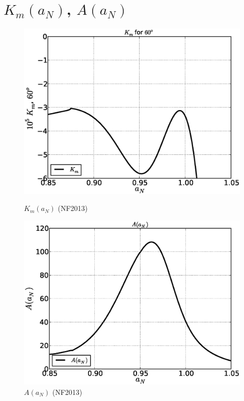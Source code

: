 \documentclass[11pt,oneside,a4paper,notitlepage]{article}
\begin{document}
\section{$K_m(a_N)$, $A(a_N)$}
\begin{figure}[h]
\begin{center}
 \begin{minipage}[h]{0.4\linewidth}
  \includegraphics[width=1.35\linewidth]{evans60/K60.eps}
  \caption{$K_m(a_N)$ (NF2013)}
  \label{fig:km60}
 \end{minipage}
 \hfill
 \begin{minipage}[h]{0.4\linewidth}
  \includegraphics[width=1.35\linewidth]{evans60/A60.eps}
  \caption{$A(a_N)$ (NF2013)}
  \label{fig:A60}
 \end{minipage}  
\end{center}
\end{figure}
\newpage
\end{document}
